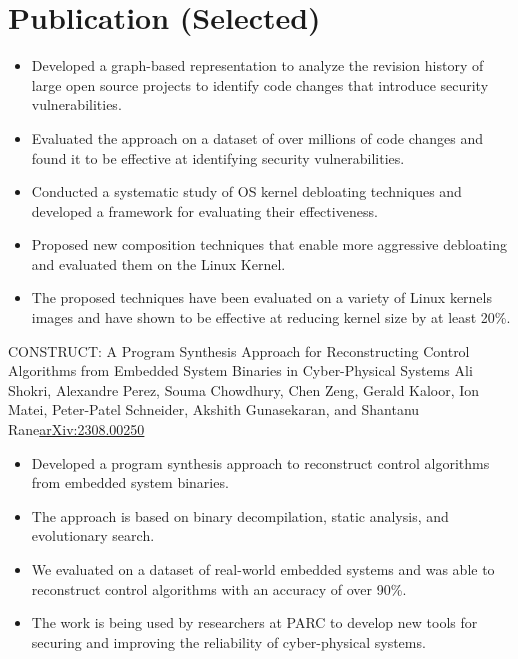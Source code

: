 \section{Publication (Selected)}
 {
    \begin{itemize}
        \item Developed a graph-based representation to analyze the revision
              history of large open source projects to identify code changes
              that introduce security vulnerabilities.
        \item Evaluated the approach on a dataset of over millions of code
              changes and found it to be effective at identifying security
              vulnerabilities.
    \end{itemize}
}

 {
    \begin{itemize}
        \item Conducted a systematic study of OS kernel debloating techniques
              and developed a framework for evaluating their effectiveness.
        \item Proposed new composition techniques that enable more aggressive
              debloating and evaluated them on the Linux Kernel.
        \item The proposed techniques have been evaluated on a variety of Linux
              kernels images and have shown to be effective at reducing kernel
              size by at least 20\%.
    \end{itemize}
}

{CONSTRUCT: A Program Synthesis Approach for Reconstructing Control
    Algorithms from Embedded System Binaries in Cyber-Physical Systems} {Ali
    Shokri, Alexandre Perez, Souma Chowdhury, Chen Zeng, Gerald Kaloor, Ion
    Matei, Peter-Patel Schneider, Akshith Gunasekaran, and Shantanu
    Rane}{\href{https://arxiv.org/pdf/2308.00250.pdf}{arXiv:2308.00250}}{} {
    \begin{itemize}
        \item Developed a program synthesis approach to reconstruct control
              algorithms from embedded system binaries.
        \item The approach is based on binary decompilation, static analysis,
              and evolutionary search.
        \item We evaluated on a dataset of real-world embedded systems and was
              able to reconstruct control algorithms with an accuracy of over
              90\%.
        \item The work is being used by researchers at PARC to develop new tools
              for securing and improving the reliability of cyber-physical
              systems.
    \end{itemize}
}

